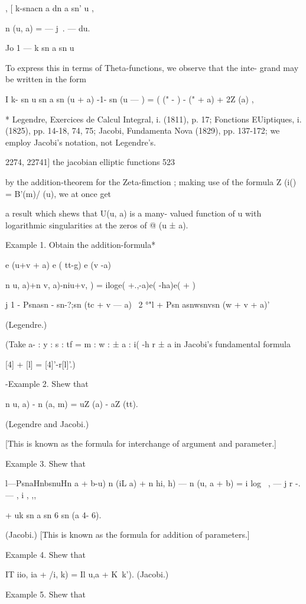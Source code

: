   , [ k-snacn a dn a sn' u ,

n (u, a) = — j~. — du.

  Jo 1 — k sn a sn u

To express this in terms of Theta-functions, we observe that the inte-
grand may be written in the form

I k- sn u sn a sn (u + a) -1- sn (u — ) = ( (" - ) - (" + a) + 2Z (a)
,

* Legendre, Exercices de Calcul Integral, i. (1811), p. 17; Fonctions
EUiptiques, i. (1825), pp. 14-18, 74, 75; Jacobi, Fundamenta Nova
(1829), pp. 137-172; we employ Jacobi's notation, not Legendre's.



2274, 22741] the jacobian elliptic functions 523

by the addition-theorem for the Zeta-fimction ; making use of the
formula Z (i() = B'(m)/ (u), we at once get

a result which shews that U(u, a) is a many- valued function of u with
logarithmic singularities at the zeros of @ (u ± a).

Example 1. Obtain the addition-formula*

e (u+v + a) e ( tt-g) e (v -a)

n u, a)+n v, a)-niu+v, ) = iloge( +.,-a)e( -ha)e( + )

j 1 - Psnasn - sn-?;sn (tc + v — a) ~2 °"l + Psn asnwsnvsn (w + v +
a)'

(Legendre.)

(Take a- : y : s : tf = m : w : ± a : i( -h r ± a in Jacobi's
fundamental formula

[4] + [l] = [4]'-r[l]'.)

-Example 2. Shew that

n u, a) - n (a, m) = uZ (a) - aZ (tt).

(Legendre and Jacobi.)

[This is known as the formula for interchange of argument and
parameter.]

Example 3. Shew that

l—PsnaHnbsnuHn a + b-u) n (iL a) + n hi, h) — n (u, a + b) = i log \ ,
— j r -. — , i , ,,\

+ uk sn a sn 6 sn (a 4- 6).

(Jacobi.) [This is known as the formula for addition of parameters.]

Example 4. Shew that

IT iio, ia + /i, k) = Il u,a + K\ k'). (Jacobi.)

Example 5. Shew that

